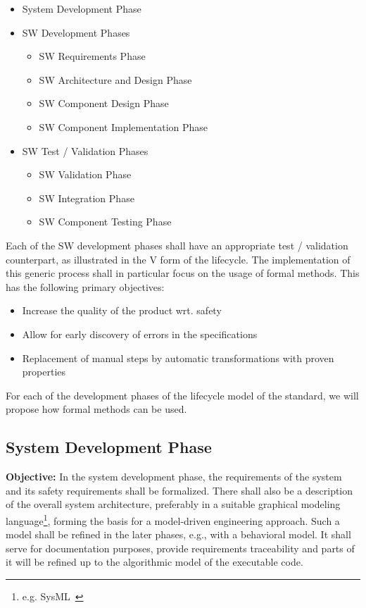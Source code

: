 \begin{itemize}
\item System Development Phase
\item SW Development Phases
  \begin{itemize}
  \item SW Requirements Phase
  \item SW Architecture and Design Phase
  \item SW Component Design Phase
  \item SW Component Implementation Phase
  \end{itemize}
\item SW Test / Validation Phases
  \begin{itemize}
  \item SW Validation Phase
  \item SW Integration Phase
  \item SW Component Testing Phase
  \end{itemize}
\end{itemize}

Each of the SW development phases shall have an appropriate test / validation
counterpart, as illustrated in the V form of the lifecycle. The implementation
of this generic process shall in particular focus on the usage of formal
methods. This has the following primary objectives:

\begin{itemize}
\item Increase the quality of the product wrt. safety
\item Allow for early discovery of errors in the  specifications
\item Replacement of manual steps by automatic transformations with proven
  properties
\end{itemize}

For each of the development phases of the lifecycle model of the standard, we
will propose how formal methods can be used.

\subsection{System Development Phase}
\label{sec:syst-devel-phase}

{\bf Objective:} In the system development phase, the requirements of the system
and its safety requirements shall be formalized. There shall also be a
description of the overall system architecture, preferably in a suitable
graphical modeling language\footnote{e.g. SysML~\cite{SysMLSpec}}, forming the
basis for a model-driven engineering approach. Such a model shall be refined in
the later phases, e.g., with a behavioral model. It shall serve for
documentation purposes, provide requirements traceability and parts of it will
be refined up to the algorithmic model of the executable code.


